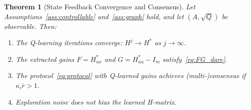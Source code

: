 \documentclass[12pt]{elsarticle}
\newtheorem{theorem}{Theorem}
\theoremstyle{remark}
\begin{document}
\begin{theorem}[State Feedback Convergence and Consensus]
\label{thm:sf_convergence}
Let Assumptions~\ref{ass:controllable} and~\ref{ass:graph} hold, and let $(A, \sqrt{Q})$ be observable. Then:
\begin{enumerate}
    \item[(i)] The Q-learning iterations converge: $H^j \to H^*$ as $j \to \infty$.
    \item[(ii)] The extracted gains $F = H_{ux}^*$ and $G = H_{uu}^* - I_m$ satisfy~\eqref{eq:FG_dare}.
    \item[(iii)] The protocol~\eqref{eq:protocol} with Q-learned gains achieves (multi-)consensus if $\kappa_i \bar{r} > 1$.
    \item[(iv)] Exploration noise does not bias the learned H-matrix.
\end{enumerate}
\end{theorem}
\end{document}
